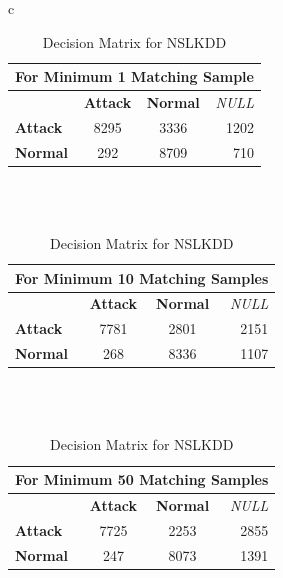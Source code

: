\documentclass[pdflatex,sn-mathphys-num]{sn-jnl}%
\let\oldcaption\caption
\renewcommand{\caption}[1]{\oldcaption{\centering #1}}
\theoremstyle{thmstyleone}%
\theoremstyle{thmstyletwo}%
\theoremstyle{thmstylethree}%
\begin{document}
\begin{table}[ht!]
    \centering
    \caption{Decision Matrix for NSLKDD}
    \label{tab:NSLKDD_Matrix}

    \begin{tabular}{c}

    \begin{tabular}{|l|c|c|r|}
        \hline
        \multicolumn{4}{|c|}{\textbf{For Minimum 1 Matching Sample}} \\ \hline
         & \textbf{Attack} & \textbf{Normal} & \textit{NULL} \\  \hline 
        \textbf{Attack} & 8295 & 3336 & 1202 \\ \hline 
        \textbf{Normal} & 292 & 8709 & 710 \\ \hline
    \end{tabular}

\\
\\
    \begin{tabular}{|l|c|c|r|}
        \hline
        \multicolumn{4}{|c|}{\textbf{For Minimum 10 Matching Samples}} \\ \hline
         & \textbf{Attack} & \textbf{Normal} & \textit{NULL} \\  \hline 
        \textbf{Attack} & 7781 & 2801 & 2151 \\ \hline 
        \textbf{Normal} & 268 & 8336 & 1107 \\ \hline
    \end{tabular}

\\
\\
    \begin{tabular}{|l|c|c|r|}
        \hline
        \multicolumn{4}{|c|}{\textbf{For Minimum 50 Matching Samples}} \\ \hline
         & \textbf{Attack} & \textbf{Normal} & \textit{NULL} \\  \hline 
        \textbf{Attack} & 7725 & 2253 & 2855 \\ \hline 
        \textbf{Normal} & 247 & 8073 & 1391 \\ \hline
    \end{tabular}

    \end{tabular}

\end{table}
\end{document}
